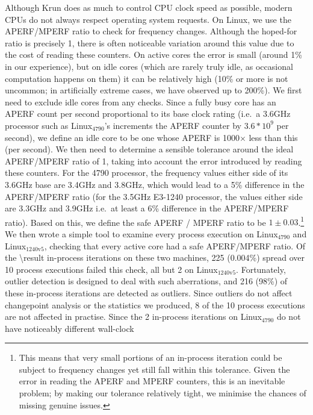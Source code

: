 \documentclass[acmsmall]{acmart}\settopmatter{printfolios=true}
\newcommand{\krun}{Krun\xspace}
\newcommand{\bencherfive}{Linux$_\mathrm{4790}$\xspace}
\newcommand{\bencherseven}{Linux$_\mathrm{1240v5}$\xspace}
\begin{document}
Although \krun does as much to control CPU clock speed as possible, modern CPUs
do not always respect operating system requests. On Linux, we use the
APERF/MPERF ratio to check for frequency changes. Although the hoped-for
ratio is precisely 1, there is often noticeable variation around this value due to the
cost of reading these counters. On active cores the error is small (around 1\% in our
experience), but on idle cores (which are rarely truly idle, as occasional
computation happens on them) it can be relatively high (10\% or more is
not uncommon; in artificially extreme cases, we have observed up to 200\%).
We first need to exclude idle cores from any checks. Since a fully busy core has
an APERF count per second proportional to its base clock rating (i.e.~a 3.6GHz processor
such as \bencherfive's increments the APERF counter by $3.6*10^9$ per second),
we define an idle core to be one whose APERF is 1000$\times$ less than this (per
second). We then need to determine a sensible tolerance around the ideal APERF/MPERF ratio of 1,
taking into account the error introduced by reading these counters.
For the 4790 processor, the frequency values either side of its 3.6GHz base
are 3.4GHz and 3.8GHz, which would lead to a 5\% difference in the APERF/MPERF
ratio (for the 3.5GHz E3-1240 processor, the values either side are 3.3GHz and 3.9GHz i.e.~at
least a 6\% difference in the APERF/MPERF ratio). Based on this, we define the
safe APERF / MPERF ratio to be $1\pm0.03$.\footnote{This means that very small
portions of an in-process iteration could be subject to frequency changes yet still fall within
this tolerance. Given the error in reading the APERF and MPERF counters, this is an
inevitable problem; by making our tolerance relatively tight, we minimise the
chances of missing genuine issues.} We then wrote a simple tool to examine
every process execution on \bencherfive and \bencherseven, checking that every
%
active core had a safe APERF/MPERF ratio. Of the \num{\result}\xspace in-process iterations
on these two machines, 225 (0.004\%) spread over 10 process executions failed
this check, all but 2 on \bencherseven. Fortunately, outlier detection is designed
to deal with such aberrations, and 216 (98\%) of these in-process iterations are
detected as outliers. Since outliers do not affect changepoint analysis or
the statistics we produced, 8 of the 10 process executions are not affected in practise.
Since the 2 in-process iterations on \bencherfive do not have noticeably different wall-clock
\end{document}
